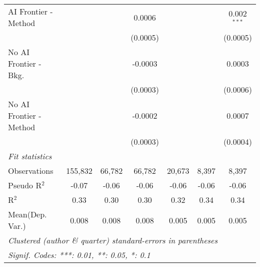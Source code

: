 \begin{tabular}{lcccccc}
   AI Frontier - Method    &          &          & 0.0006   &              &             & 0.002$^{***}$\\   
                           &          &          & (0.0005) &              &             & (0.0005)\\   
   No AI Frontier - Bkg.   &          &          & -0.0003  &              &             & 0.0003\\   
                           &          &          & (0.0003) &              &             & (0.0006)\\   
   No AI Frontier - Method &          &          & -0.0002  &              &             & 0.0007\\   
                           &          &          & (0.0003) &              &             & (0.0004)\\   
   \midrule
   \emph{Fit statistics}\\
   Observations            & 155,832  & 66,782   & 66,782   & 20,673       & 8,397       & 8,397\\  
   Pseudo R$^2$            & -0.07    & -0.06    & -0.06    & -0.06        & -0.06       & -0.06\\  
   R$^2$                   & 0.33     & 0.30     & 0.30     & 0.32         & 0.34        & 0.34\\  
Mean(Dep. Var.) & 0.008 & 0.008 & 0.008 & 0.005 & 0.005 & 0.005 \\
   \midrule \midrule
   \multicolumn{7}{l}{\emph{Clustered (author \& quarter) standard-errors in parentheses}}\\
   \multicolumn{7}{l}{\emph{Signif. Codes: ***: 0.01, **: 0.05, *: 0.1}}\\
\end{tabular}
\par\endgroup
